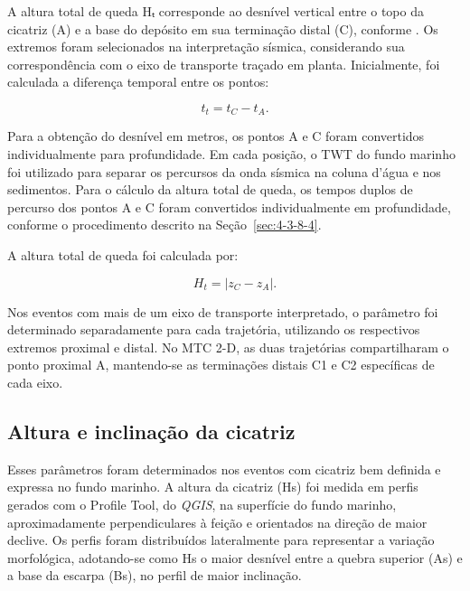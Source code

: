 A altura total de queda Hₜ corresponde ao desnível vertical entre o topo da cicatriz (A) e a base do depósito em sua terminação distal (C), conforme . Os extremos foram selecionados na interpretação sísmica, considerando sua correspondência com o eixo de transporte traçado em planta. Inicialmente, foi calculada a diferença temporal entre os pontos:

\begin{equation}
  t_t=t_C-t_A.
  \label{eq:diferenca-altura-total}
\end{equation}

Para a obtenção do desnível em metros, os pontos A e C foram convertidos individualmente para profundidade. Em cada posição, o TWT do fundo marinho foi utilizado para separar os percursos da onda sísmica na coluna d’água e nos sedimentos. Para o cálculo da altura total de queda, os tempos duplos de percurso dos pontos A e C foram convertidos individualmente em profundidade, conforme o procedimento descrito na Seção~\ref{sec:4-3-8-4}.

A altura total de queda foi calculada por:

\begin{equation}
  H_t=\lvert z_C-z_A\rvert.
  \label{eq:altura-total}
\end{equation}

Nos eventos com mais de um eixo de transporte interpretado, o parâmetro foi determinado separadamente para cada trajetória, utilizando os respectivos extremos proximal e distal. No MTC 2-D, as duas trajetórias compartilharam o ponto proximal A, mantendo-se as terminações distais C1 e C2 específicas de cada eixo.

\subsection{Altura e inclinação da cicatriz}\label{sec:4-3-5}

Esses parâmetros foram determinados nos eventos com cicatriz bem definida e expressa no fundo marinho. A altura da cicatriz (Hs) foi medida em perfis gerados com o Profile Tool, do \textit{QGIS}, na superfície do fundo marinho, aproximadamente perpendiculares à feição e orientados na direção de maior declive. Os perfis foram distribuídos lateralmente para representar a variação morfológica, adotando-se como Hs o maior desnível entre a quebra superior (As) e a base da escarpa (Bs), no perfil de maior inclinação.

